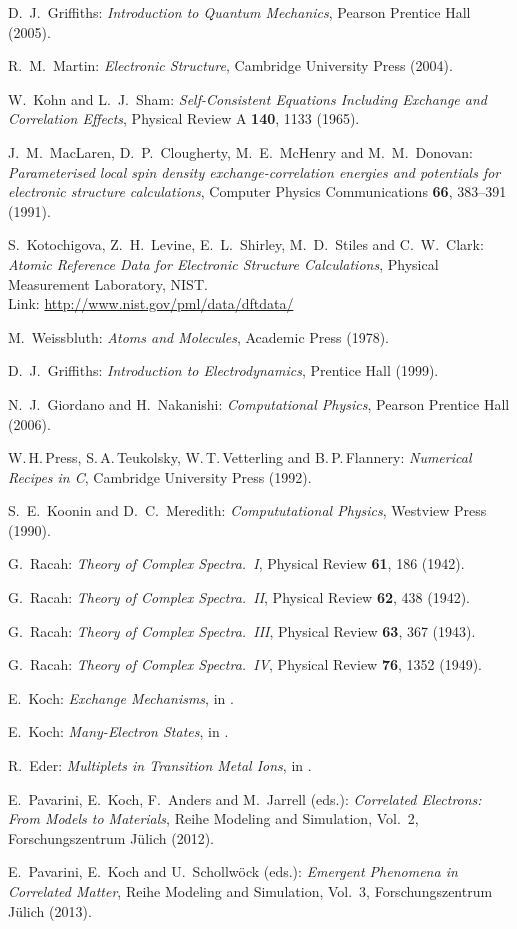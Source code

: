 \begin{thebibliography}{99}
   D.\ J.\ Griffiths: {\em Introduction to Quantum Mechanics}, Pearson Prentice Hall (2005).

   R.\ M.\ Martin: {\em Electronic Structure}, Cambridge University Press (2004).
  
   W.\ Kohn and L.\ J.\ Sham: {\em Self-Consistent Equations Including Exchange and Correlation Effects}, Physical Review A {\bf 140}, 1133 (1965).

   J.\ M.\ MacLaren, D.\ P.\ Clougherty, M.\ E.\ McHenry and M.\ M.\ Donovan: {\em Parameterised local spin density exchange-correlation energies and potentials for electronic structure calculations}, Computer Physics Communications {\bf 66}, 383--391 (1991).

   S.\ Kotochigova, Z.\ H.\ Levine, E.\ L.\ Shirley, M.\ D.\ Stiles and C.\ W.\ Clark: {\em Atomic Reference Data for Electronic Structure Calculations}, Physical Measurement Laboratory, NIST.\\ Link: \url{http://www.nist.gov/pml/data/dftdata/}
  
   M.\ Weissbluth: {\em Atoms and Molecules}, Academic Press (1978).
  
   D.\ J.\ Griffiths: {\em Introduction to Electrodynamics}, Prentice Hall (1999).
  
   N.\ J.\ Giordano and H.\ Nakanishi: {\em Computational Physics}, Pearson Prentice Hall (2006).
  
   W.\,H.\,Press, S.\,A.\,Teukolsky, W.\,T.\,Vetterling and B.\,P.\,Flannery: {\em Numerical Recipes in C}, Cambridge University Press (1992).

   S.\ E.\ Koonin and D.\ C.\ Meredith: {\em Compututational Physics}, Westview Press (1990).
  
   G.\ Racah: {\em Theory of Complex Spectra.~I}, Physical Review {\bf 61}, 186 (1942).

   G.\ Racah: {\em Theory of Complex Spectra.~II}, Physical Review {\bf 62}, 438 (1942).
  
   G.\ Racah: {\em Theory of Complex Spectra.~III}, Physical Review {\bf 63}, 367 (1943).
  
   G.\ Racah: {\em Theory of Complex Spectra.~IV}, Physical Review {\bf 76}, 1352 (1949).
  
   E.\ Koch: {\em Exchange Mechanisms}, in \cite{YB}.
  
   E.\ Koch: {\em Many-Electron States}, in \cite{GB}.
  
   R.\ Eder: {\em Multiplets in Transition Metal Ions}, in \cite{YB}.
  
   E.\ Pavarini, E.\ Koch, F.\ Anders and M.\ Jarrell (eds.): {\em Correlated Electrons: From Models to Materials}, Reihe Modeling and Simulation, Vol.\ 2, Forschungszentrum J\"{u}lich (2012).
  
   E.\ Pavarini, E.\ Koch and U.\ Schollw\"{o}ck (eds.): {\em Emergent Phenomena in Correlated Matter}, Reihe Modeling and Simulation, Vol.\ 3, Forschungszentrum J\"{u}lich (2013).
\end{thebibliography}
